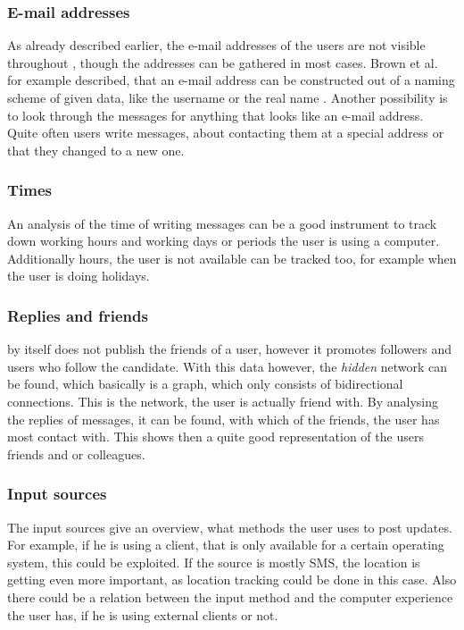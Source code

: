 \subsubsection{E-mail addresses}

As already described earlier, the e-mail addresses of the users are not visible
throughout \Twitter{}, though the addresses can be gathered in most cases.
Brown et al. for example described, that an e-mail address can be constructed out
of a naming scheme of given data, like the username or the real name
\cite{brown2008}. Another possibility is to look through the messages for
anything that looks like an e-mail address. Quite often users write messages,
about contacting them at a special address or that they changed to a new one.

\subsubsection{Times}

An analysis of the time of writing messages can be a good instrument to track
down working hours and working days or periods the user is using a computer.
Additionally hours, the user is not available can be tracked too, for example
when the user is doing holidays.

\subsubsection{Replies and friends}

\Twitter{} by itself does not publish the friends of a user, however it
promotes followers and users who follow the candidate. With this data however,
the \textit{hidden} network can be found, which basically is a graph, which
only consists of bidirectional connections. This is the network, the user is
actually friend with. By analysing the replies of messages, it can be found,
with which of the friends, the user has most contact with. This shows then a
quite good representation of the users friends and or colleagues.

\subsubsection{Input sources}

The \Twitter{} input sources give an overview, what methods the user uses to
post updates. For example, if he is using a \Twitter{} client, that is only
available for a certain operating system, this could be exploited. If the
source is mostly SMS, the location is getting even more important, as location
tracking could be done in this case. Also there could be a relation between the
input method and the computer experience the user has, if he is using external
clients or not.

